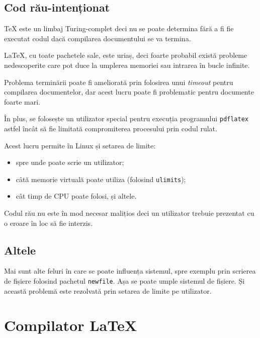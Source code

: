\documentclass[a4wide,12pt]{report}
\newcommand{\eng}[1]{\emph{#1}} %
\newcommand{\cod}[1]{\texttt{#1}}
\begin{document}
\subsection{Cod rău-intenționat}

\TeX{} este un limbaj Turing-complet deci nu se poate determina fără a fi fie
executat codul dacă compilarea documentului se va termina.

\LaTeX{}, cu toate pachetele sale, este uriaș, deci foarte probabil există
probleme nedescoperite care pot duce la umplerea memoriei sau intrarea în bucle
infinite.

Problema terminării poate fi ameliorată prin folosirea unui \eng{timeout} pentru
compilarea documentelor, dar acest lucru poate fi problematic pentru documente
foarte mari.

În plus, se folosește un utilizator special pentru execuția programului
\cod{pdflatex} astfel încât să fie limitată compromiterea procesului prin codul
rulat.

Acest lucru permite în Linux și setarea de limite:

\begin{itemize}

\item spre unde poate scrie un utilizator;

\item câtă memorie virtuală poate utiliza (folosind \cod{ulimits});

\item cât timp de CPU poate folosi, și altele.

\end{itemize}

Codul rău nu este în mod necesar malițios deci un utilizator trebuie prezentat
cu o eroare în loc să fie interzis.

\subsection{Altele}

Mai sunt alte feluri în care se poate influența sistemul, spre exemplu prin
scrierea de fișiere folosind pachetul \cod{newfile}. Așa se poate umple sistemul
de fișiere. Și această problemă este rezolvată prin setarea de limite pe
utilizator.

\section{Compilator \LaTeX}
\end{document}
